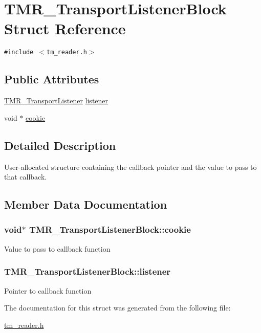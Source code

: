 \hypertarget{struct_t_m_r___transport_listener_block}{
\section{TMR\_\-TransportListenerBlock Struct Reference}
\label{struct_t_m_r___transport_listener_block}
}
{\tt \#include $<$tm\_\-reader.h$>$}

\subsection*{Public Attributes}
\begin{CompactItemize}
\item 
\hyperlink{tm__reader_8h_ee5ffafaeca03b3d972b8a5570f64b0c}{TMR\_\-TransportListener} \hyperlink{struct_t_m_r___transport_listener_block_bc7ccd0ed33073e3335cd500cc9507ec}{listener}
\item 
void $\ast$ \hyperlink{struct_t_m_r___transport_listener_block_88e2a93ee8338643441d9ace7aec9c6f}{cookie}
\end{CompactItemize}


\subsection{Detailed Description}
User-allocated structure containing the callback pointer and the value to pass to that callback. 

\subsection{Member Data Documentation}
\hypertarget{struct_t_m_r___transport_listener_block_88e2a93ee8338643441d9ace7aec9c6f}{
\subsubsection[{cookie}]{\setlength{\rightskip}{0pt plus 5cm}void$\ast$ {\bf TMR\_\-TransportListenerBlock::cookie}}}
\label{struct_t_m_r___transport_listener_block_88e2a93ee8338643441d9ace7aec9c6f}


Value to pass to callback function \hypertarget{struct_t_m_r___transport_listener_block_bc7ccd0ed33073e3335cd500cc9507ec}{
\subsubsection[{listener}]{ {\bf TMR\_\-TransportListenerBlock::listener}}}
\label{struct_t_m_r___transport_listener_block_bc7ccd0ed33073e3335cd500cc9507ec}


Pointer to callback function 

The documentation for this struct was generated from the following file:\begin{CompactItemize}
\item 
\hyperlink{tm__reader_8h}{tm\_\-reader.h}\end{CompactItemize}
